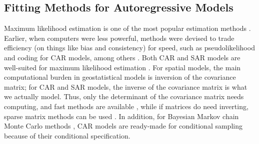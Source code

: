 \documentclass[11pt, titlepage]{article}\usepackage[]{graphicx}\usepackage[]{color}
\begin{document}
\begin{spacing}{1.9}
\begin{flushleft}
\subsection*{Fitting Methods for Autoregressive Models}

Maximum likelihood estimation is one of the most popular estimation methods \citep{Cres:stat:1993}. Earlier, when computers were less powerful, methods were devised to trade efficiency (on things like bias and consistency) for speed, such as pseudolikelihood \citep{Besa:stat:1975} and coding \citep{Besa:spat:1974} for CAR models, among others \citep{Cres:stat:1993}.  Both CAR and SAR models are well-suited for maximum likelihood estimation \citep{Bane:Carl:Gelf:hier:2014}. For spatial models, the main computational burden in geostatistical models is inversion of the covariance matrix; for CAR and SAR models, the inverse of the covariance matrix is what we actually model.  Thus, only the determinant of the covariance matrix needs computing, and fast methods are available \citep{ Pace:Barr:fast:1997, Pace:Barr:spar:1997}, while if matrices do need inverting, sparse matrix methods can be used \citep{Rue:Held:Gaus:2005}. In addition, for Bayesian Markov chain Monte Carlo methods \citep[MCMC;][]{Gelf:Smit:samp:1990}, CAR models are ready-made for conditional sampling because of their conditional specification.


\end{flushleft}
\end{spacing}
\end{document}
